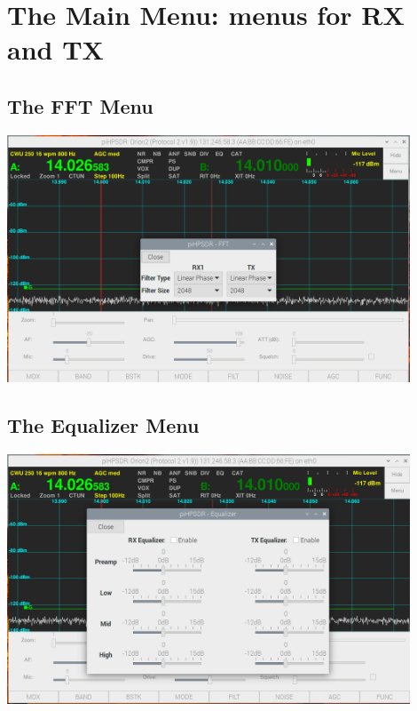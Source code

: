 \documentclass[12pt]{book}
\begin{document}
\chapter{The Main Menu: menus for RX and TX}

\section{The FFT Menu}
\begin{center}
\includegraphics[width=12cm]{FFTMenu.png}
\end{center}

\section{The Equalizer Menu}
\begin{center}
\includegraphics[width=12cm]{EqualizerMenu.png}
\end{center}
\end{document}
